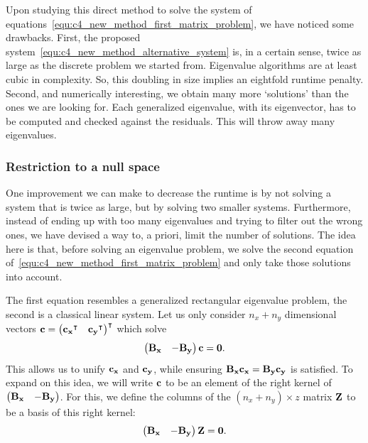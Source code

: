 Upon studying this direct method to solve the system of equations~\eqref{equ:c4_new_method_first_matrix_problem}, we have noticed some drawbacks. First, the proposed system~\eqref{equ:c4_new_method_alternative_system} is, in a certain sense, twice as large as the discrete problem we started from. Eigenvalue algorithms are at least cubic in complexity. So, this doubling in size implies an eightfold runtime penalty. Second, and numerically interesting, we obtain many more `solutions' than the ones we are looking for. Each generalized eigenvalue, with its eigenvector, has to be computed and checked against the residuals. This will throw away many eigenvalues.

\subsubsection{Restriction to a null space}\label{sec:nm_by_restriction}

One improvement we can make to decrease the runtime is by not solving a system that is twice as large, but by solving two smaller systems. Furthermore, instead of ending up with too many eigenvalues and trying to filter out the wrong ones, we have devised a way to, a priori, limit the number of solutions. The idea here is that, before solving an eigenvalue problem, we solve the second equation of~\eqref{equ:c4_new_method_first_matrix_problem} and only take those solutions into account.

The first equation resembles a generalized rectangular eigenvalue problem, the second is a classical linear system. Let us only consider $n_x + n_y$ dimensional vectors $\vb{c} = {\begin{pmatrix}{\vb{c_x}}^\intercal & {\vb{c_y}}^\intercal \end{pmatrix}}^\intercal$ which solve
$$
    \begin{pmatrix}\vb{B_x} & -\vb{B_y} \end{pmatrix} \vb{c} = \vb{0}\text{.}
$$
This allows us to unify $\vb{c_x}$ and $\vb{c_y}$, while ensuring $\vb{B_x} \vb{c_x} = \vb{B_y} \vb{c_y}$ is satisfied. To expand on this idea, we will write $\vb{c}$ to be an element of the right kernel of  $\begin{pmatrix}\vb{B_x} & -\vb{B_y} \end{pmatrix}$. For this, we define the columns of the $(n_x + n_y) \times z$ matrix $\vb{Z}$ to be a basis of this right kernel:
\begin{equation}\label{equ:c4_null_space_kernel}
    \begin{pmatrix}\vb{B_x} & -\vb{B_y} \end{pmatrix} \vb{Z} = \vb{0}\text{.}
\end{equation}

